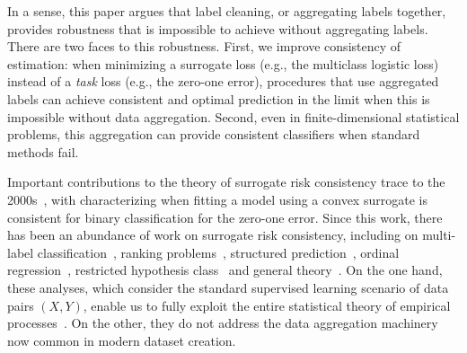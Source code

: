 \documentclass[11pt]{article}
\begin{document}
In a sense, this paper argues that label cleaning, or aggregating labels
together, provides robustness that is impossible to achieve
without aggregating labels.
%
There are two faces to this robustness.
%
First, we improve consistency of estimation:
when minimizing a surrogate loss (e.g., the multiclass logistic
loss) instead of a \emph{task} loss (e.g., the zero-one error),
procedures that use aggregated labels can achieve consistent and optimal
prediction in the limit when this is impossible without data aggregation.
%
Second, even in finite-dimensional statistical problems, this
aggregation can provide consistent classifiers when
standard methods fail.


Important contributions to the theory of surrogate risk consistency trace to
the 2000s~\citep{Zhang04b,LugosiVa04, Steinwart07}, with
\citet*{BartlettJoMc06} characterizing when fitting a model using a convex
surrogate is consistent for binary classification for the zero-one error.
%
%
Since this work, there has been an abundance of work on
surrogate risk consistency, including on multi-label
classification~\citep{Zhang04, TewariBa07, GaoZh11, ZhangAg20,
  AwasthiFrMaMoZh21}, ranking problems~\citep{DuchiMaJo10, DuchiMaJo12,
  PiresSzGh13}, structured prediction~\citep{OsokinBaLa17, CabannesRuBa20,
  NowakBaRu20}, ordinal regression~\citep{PedregosaBaGr17}, restricted hypothesis class~\citep{AwasthiMaMoZh22,
  AwasthiMaMoZh22b, MaoMoZh24, MaoMoZh25} and general theory~\citep{Steinwart07}.
%
On the one hand,
these analyses, which consider the standard supervised learning scenario of
data pairs $(X, Y)$,  enable us to fully exploit the entire
statistical theory of empirical processes~\citep{VanDerVaartWe96,
  BartlettBoMe05, Koltchinskii06a, BartlettJoMc06}.
%
On the other, they do not address the data aggregation machinery now
common in modern dataset creation.
\end{document}
